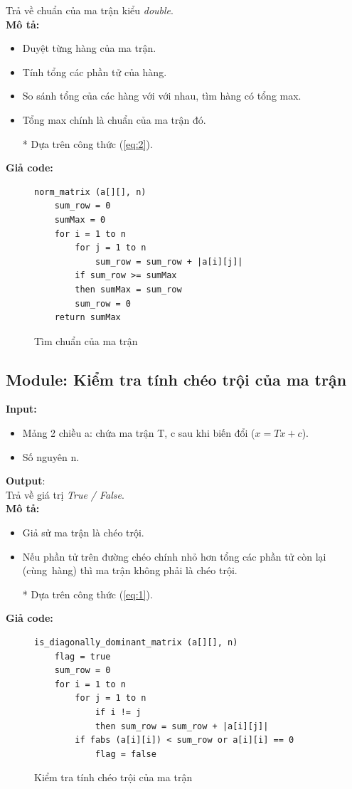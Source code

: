 \documentclass[twoside]{report2}
\begin{document}
\quad Trả về chuẩn của ma trận kiểu \emph{double}.\\

\textbf{Mô tả:}
\begin{itemize}
\item Duyệt từng hàng của ma trận.
\item Tính tổng các phần tử của hàng.
\item So sánh tổng của các hàng với với nhau, tìm hàng có tổng max.
\item Tổng max chính là chuẩn của ma trận đó.
\item[*] Dựa trên công thức (\ref{eq:2}).
\end{itemize}

\textbf{Giả code:}
\begin{figure}[h]
\begin{lstlisting}[frame=single]
norm_matrix (a[][], n)
    sum_row = 0
    sumMax = 0
    for i = 1 to n
        for j = 1 to n
            sum_row = sum_row + |a[i][j]|
        if sum_row >= sumMax
        then sumMax = sum_row
        sum_row = 0
    return sumMax
\end{lstlisting}
\caption{Tìm chuẩn của ma trận}
\end{figure}


\newpage
\subsection{Module: Kiểm tra tính chéo trội của ma trận}
\textbf{Input:}
\begin{itemize}
\item Mảng 2 chiều a: chứa ma trận T, c sau khi biến đổi ($x = Tx + c$).
\item Số nguyên n.
\end{itemize}
\textbf{Output}:\\

\quad Trả về giá trị \emph{True / False}.\\

\textbf{Mô tả:}
\begin{itemize}
\item Giả sử ma trận là chéo trội.
\item Nếu phần tử trên đường chéo chính nhỏ hơn tổng các phần tử còn lại (cùng~hàng) thì ma trận không phải là chéo trội.
\item[*] Dựa trên công thức (\ref{eq:1}).
\end{itemize}

\textbf{Giả code:}
\begin{figure}[h]
\begin{lstlisting}[frame=single]
is_diagonally_dominant_matrix (a[][], n)
    flag = true
    sum_row = 0
    for i = 1 to n
        for j = 1 to n
            if i != j
            then sum_row = sum_row + |a[i][j]|
        if fabs (a[i][i]) < sum_row or a[i][i] == 0
            flag = false
\end{lstlisting}
\caption{Kiểm tra tính chéo trội của ma trận}
\end{figure}
\end{document}
